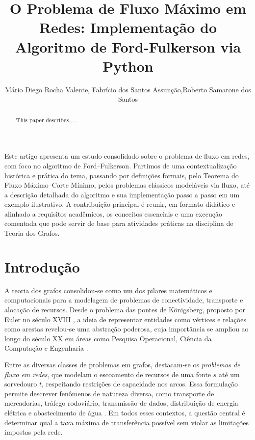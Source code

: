 \documentclass[12pt]{article}
\title{O Problema de Fluxo Máximo em Redes: Implementação do Algoritmo de Ford-Fulkerson via Python}
\author{Mário Diego Rocha Valente\inst{1}, Fabrício dos Santos Assunção\inst{1},Roberto Samarone dos Santos\inst{2}}
\begin{document}
 

\maketitle

\begin{abstract}
  This paper describes.....
\end{abstract}
     
\begin{resumo} 
  Este artigo apresenta um estudo consolidado sobre o problema de fluxo em redes, com foco no algoritmo de Ford–Fulkerson. Partimos de uma contextualização histórica e prática do tema, passando por definições formais, pelo Teorema do Fluxo Máximo–Corte Mínimo, pelos problemas clássicos modeláveis via fluxo, até a descrição detalhada do algoritmo e sua implementação passo a passo em um exemplo ilustrativo. A contribuição principal é reunir, em formato didático e alinhado a requisitos acadêmicos, os conceitos essenciais e uma execução comentada que pode servir de base para atividades práticas na disciplina de Teoria dos Grafos.
\end{resumo}

\newpage
\section{Introdução}

A teoria dos grafos consolidou-se como um dos pilares matemáticos e computacionais para a modelagem de problemas de conectividade, transporte e alocação de recursos. Desde o problema das pontes de Königsberg, proposto por Euler no século XVIII \cite{euler1736}, a ideia de representar entidades como vértices e relações como arestas revelou-se uma abstração poderosa, cuja importância se ampliou ao longo do século XX em áreas como Pesquisa Operacional, Ciência da Computação e Engenharia \cite{bondy1976,west2001}.

\noindent Entre as diversas classes de problemas em grafos, destacam-se os \emph{problemas de fluxo em redes}, que modelam o escoamento de recursos de uma fonte $s$ até um sorvedouro $t$, respeitando restrições de capacidade nos arcos. Essa formulação permite descrever fenômenos de natureza diversa, como transporte de mercadorias, tráfego rodoviário, transmissão de dados, distribuição de energia elétrica e abastecimento de água \cite{ahuja1993,ahuja1990}. Em todos esses contextos, a questão central é determinar qual a taxa máxima de transferência possível sem violar as limitações impostas pela rede.
\end{document}
